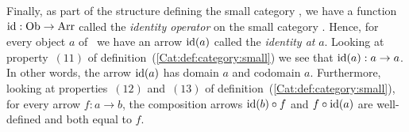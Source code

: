 Finally, as part of the structure defining the small category \Cat, we have
a function $\mbox{\rm id}:\mbox{\rm Ob}\to\mbox{\rm Arr}$ called the {\em identity operator} on the small
category \Cat. Hence, for every object $a$ of \Cat\ we have an arrow 
$\mbox{\rm id}(a)$ called the {\em identity at} $a$. Looking at property~$(11)$ of 
definition~(\ref{Cat:def:category:small}) we see that $\mbox{\rm id}(a):a\to a$. 
In other words, the arrow $\mbox{\rm id}(a)$ has domain $a$ and codomain $a$. 
Furthermore, looking at properties~$(12)$ and~$(13)$ of 
definition~(\ref{Cat:def:category:small}), for every arrow $f:a\to b$, the
composition arrows $\mbox{\rm id}(b)\circ f$ and $f\circ \mbox{\rm id}(a)$ are well-defined and both
equal to $f$.


